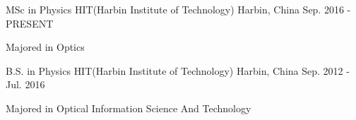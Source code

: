 \begin{cventries}
  \cventry
    {MSc in Physics}
    {HIT(Harbin Institute of Technology)}
    {Harbin, China}
    {Sep. 2016 - PRESENT}
    {
      \begin{cvitems}
        \item {Majored in Optics}
      \end{cvitems}
    }
  \cventry
    {B.S. in Physics}
    {HIT(Harbin Institute of Technology)}
    {Harbin, China}
    {Sep. 2012 - Jul. 2016}
    {
      \begin{cvitems}
        \item {Majored in Optical Information Science And Technology}
      \end{cvitems}
    }
\end{cventries}
